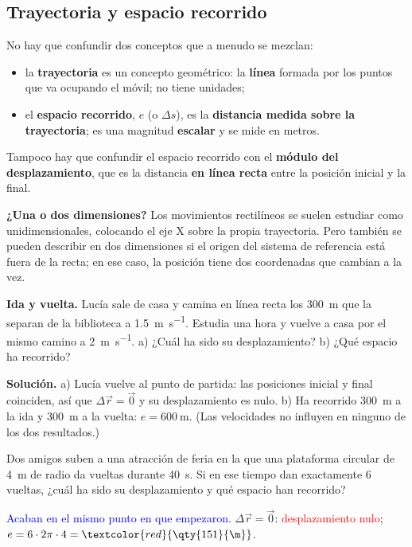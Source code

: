 \subsection{Trayectoria y espacio recorrido}

No hay que confundir dos conceptos que a menudo se mezclan:
\begin{itemize}
    \item la \textbf{trayectoria} es un concepto geométrico: la \textbf{línea} formada por los puntos que va ocupando el móvil;
    no tiene unidades;
    \item el \textbf{espacio recorrido}, \(e\) (o \(\Delta s\)), es la \textbf{distancia medida sobre la trayectoria}; es una
    magnitud \textbf{escalar} y se mide en metros.
\end{itemize}
Tampoco hay que confundir el espacio recorrido con el \textbf{módulo del desplazamiento}, que es la distancia \textbf{en línea
recta} entre la posición inicial y la final.

\begin{remark}
    \textbf{¿Una o dos dimensiones?} Los movimientos rectilíneos se suelen estudiar como unidimensionales, colocando el eje X sobre
    la propia trayectoria. Pero también se pueden describir en dos dimensiones si el origen del sistema de referencia está fuera
    de la recta; en ese caso, la posición tiene dos coordenadas que cambian a la vez.
\end{remark}

\begin{example}
    \textbf{Ida y vuelta.} Lucía sale de casa y camina en línea recta los \qty{300}{\m} que la separan de la biblioteca a
    \qty{1.5}{\m\per\s}. Estudia una hora y vuelve a casa por el mismo camino a \qty{2}{\m\per\s}. a) ¿Cuál ha sido su
    desplazamiento? b) ¿Qué espacio ha recorrido?

    \textbf{Solución.} a) Lucía vuelve al punto de partida: las posiciones inicial y final coinciden, así que
    \(\Delta\vec r = \vec 0\) y su desplazamiento es nulo. b) Ha recorrido \qty{300}{\m} a la ida y \qty{300}{\m} a la vuelta:
    \(e = \qty{600}{\m}\). (Las velocidades no influyen en ninguno de los dos resultados.)
\end{example}

\begin{exercise}
    Dos amigos suben a una atracción de feria en la que una plataforma circular de \qty{4}{\m} de radio da vueltas durante
    \qty{40}{\s}. Si en ese tiempo dan exactamente 6 vueltas, ¿cuál ha sido su desplazamiento y qué espacio han recorrido?
    \begin{solu}
        \textcolor{blue}{Acaban en el mismo punto en que empezaron.} \(\Delta\vec r = \vec 0\): \textcolor{red}{desplazamiento nulo};
        \(e = 6 \cdot 2\pi \cdot 4 = \textcolor{red}{\qty{151}{\m}}\).
    \end{solu}
\end{exercise}

